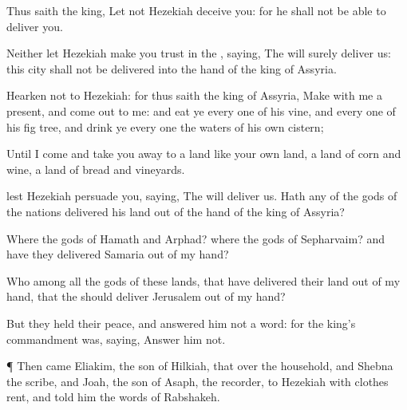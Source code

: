 {Thus
saith the
king, Let not
Hezekiah
deceive you: for he shall not be
able to
deliver you.

Neither let
Hezekiah make you
trust in the
{},
saying, The
{} will
surely
deliver us: this
city shall not be
delivered into the
hand of the
king of
Assyria.

Hearken not to
Hezekiah: for thus
saith the
king of
Assyria,
Make
{} with me
{} a
present, and come
out to me: and
eat ye every
one of his
vine, and every
one of his fig
tree, and
drink ye every
one the
waters of his own
cistern;

Until I
come and take you
away to a
land like your own
land, a
land of
corn and
wine, a
land of
bread and
vineyards.

 lest
Hezekiah
persuade you,
saying, The
{} will
deliver us. Hath
any of the
gods of the
nations
delivered his
land out of the
hand of the
king of
Assyria?

Where
{} the
gods of
Hamath and
Arphad? where
{} the
gods of
Sepharvaim? and have they
delivered
Samaria out of my
hand?

Who
{} among all the
gods of these
lands, that have
delivered their
land out of my
hand, that the
{} should
deliver
Jerusalem out of my
hand?

But they held their
peace, and
answered him not a
word: for the
king’s
commandment was,
saying,
Answer him not.


\par }{\PP {}¶ Then
came
Eliakim, the
son of
Hilkiah, that
{} over the
household, and
Shebna the
scribe, and
Joah, the
son of
Asaph, the
recorder, to
Hezekiah with
{}
clothes
rent, and
told him the
words of
Rabshakeh.




\par }
